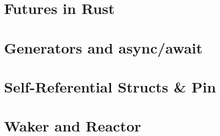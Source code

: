 \section{Futures in Rust} %
\section{Generators and async/await} %
\section{Self-Referential Structs \& Pin} %
\section{Waker and Reactor} %



